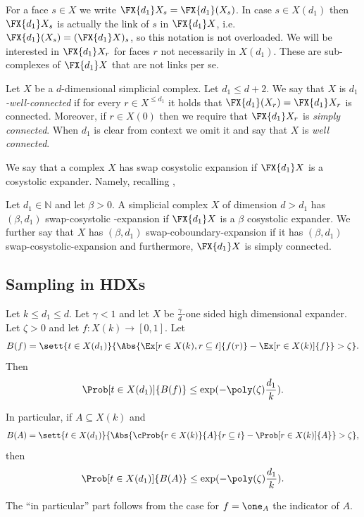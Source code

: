 For a face $s\in X$ we write $\FX{d_1}X_s = \FX{d_1}(X_s)$. In case \(s \in X(d_1)\) then \(\FX{d_1}X_s\) is actually the link of \(s\) in $\FX{d_1}X$, i.e. \(\FX{d_1}(X_s) = (\FX{d_1}X)_s\), so this notation is not overloaded. We will be interested in $\FX{d_1}X_r$ for faces $r$ not necessarily in \(X(d_1)\). These are sub-complexes of $\FX{d_1}X$ that are not links per se. 


\begin{definition} \label{def:well-connected-complex}
    Let \(X\) be a \(d\)-dimensional simplicial complex. Let \(d_1 \leq d+2\). We say that \(X\) is \emph{\(d_1\)-well-connected} if for every \(r \in X^{\leq d_1}\) it holds that \(\FX{d_1}(X_r)=\FX{d_1}X_r\) is connected. Moreover, if \(r \in X(0)\) then we require that \(\FX{d_1}X_r\) is \emph{simply connected}. When \(d_1\) is clear from context we omit it and say that \(X\) is \emph{well connected}.
\end{definition}
%
We say that a complex $X$ has swap cosystolic expansion if $\FX{d_1}X$ is a cosystolic expander. Namely, recalling ,
\begin{definition}\label{def:swapce}
    Let $d_1\in \mathbb{N}$ and let $\beta>0$. A simplicial complex $X$ of dimension $d>d_1$ has $(\beta,d_1)$ swap-cosystolic -expansion if $\FX{d_1}X$ is a $\beta$ cosystolic expander. We further say that $X$ has $(\beta,d_1)$ swap-coboundary-expansion if it has $(\beta,d_1)$ swap-cosystolic-expansion and furthermore, $\FX{d_1}X$ is simply connected. 
\end{definition}
%
\subsection{Sampling in HDXs}
%
\begin{theorem} \label{thm:sampling-in-HDXs}
    Let \(k\leq d_1 \leq d\). Let \(\gamma < 1\) and let \(X\) be \(\frac{\gamma}{d}\)-one sided high dimensional expander. Let \(\zeta > 0\) and let \(f:X(k) \to [0,1]\). Let 
    \[B(f) = \sett{t \in X(d_1)}{\Abs{\Ex[r\in X(k), r\subseteq t]{f(r)}-\Ex[r \in X(k)]{f}} > \zeta}.\] 
    Then
    \[\Prob[t \in X(d_1)]{B(f)} \leq \exp(-\poly(\zeta) \frac{d_1}{k}).\]

    In particular, if \(A \subseteq X(k)\) and 
    \[B(A) = \sett{t \in X(d_1)}{\Abs{\cProb{r\in X(k)}{A}{r\subseteq t}-\Prob[r \in X(k)]{A}} > \zeta},\] 
    then
    \[\Prob[t \in X(d_1)]{B(A)} \leq \exp(-\poly(\zeta) \frac{d_1}{k}).\]
\end{theorem}
The ``in particular'' part follows from the case for \(f=\one_A\) the indicator of \(A\).

